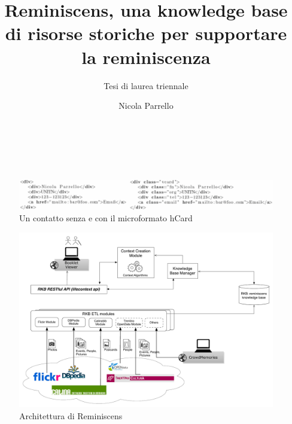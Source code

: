 \documentclass{acm_proc_article-sp}
\begin{document}
\title{Reminiscens, una knowledge base di risorse storiche per supportare la reminiscenza}
\subtitle{Tesi di laurea triennale}
 

%
\author{
\alignauthor
Nicola Parrello\\
       \\
       \\
       \\
}
\maketitle




\begin{figure}[t]
\centering
\includegraphics[width=1.0\textwidth]{microformats.pdf}
\caption{Un contatto senza e con il microformato hCard}
\label{fig:microformats}
\end{figure}



\begin{figure}[t]
\centering
\includegraphics[width=1.0\textwidth]{architecture.pdf}
\caption{Architettura di Reminiscens}
\label{fig:architecture}
\end{figure}
\end{document}
